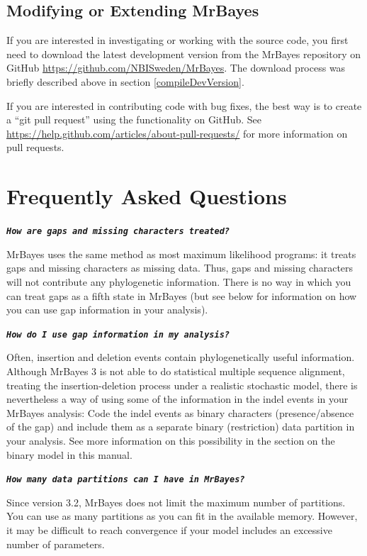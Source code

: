 \documentclass[12pt]{book}
\newcommand{\ttt}[1]{\texttt{#1} }
\newcommand{\tb}[1]{\ttt{\textbf{#1}} }
\begin{document}
\subsection{Modifying or Extending MrBayes}

If you are interested in investigating or working with the source code, you first need to download
the latest development version from the MrBayes repository on GitHub
\url{https://github.com/NBISweden/MrBayes}. The download process was briefly described above in
section \ref{compileDevVersion}.

If you are interested in contributing code with bug fixes, the best way is to create a ``git pull
request'' using the functionality on GitHub. See
\url{https://help.github.com/articles/about-pull-requests/} for more information on pull requests.


\section{Frequently Asked Questions}
\label{FAQ}

\tb{\it{How are gaps and missing characters treated?}}

MrBayes uses the same method as most maximum likelihood programs: it treats gaps and missing
characters as missing data. Thus, gaps and missing characters will not contribute any phylogenetic
information. There is no way in which you can treat gaps as a fifth state in MrBayes (but see below
for information on how you can use gap information in your analysis).

\tb{\it{How do I use gap information in my analysis?}}

Often, insertion and deletion events contain phylogenetically useful information.  Although MrBayes
3 is not able to do statistical multiple sequence alignment, treating the insertion-deletion
process under a realistic stochastic model, there is nevertheless a way of using some of the
information in the indel events in your MrBayes analysis: Code the indel events as binary
characters (presence/absence of the gap) and include them as a separate binary (restriction) data
partition in your analysis. See more information on this possibility in the section on the binary
model in this manual.

\tb{\it{How many data partitions can I have in MrBayes?}}

Since version 3.2, MrBayes does not limit the maximum number of partitions. You can use as many
partitions as you can fit in the available memory. However, it may be difficult to reach
convergence if your model includes an excessive number of parameters.
\end{document}
